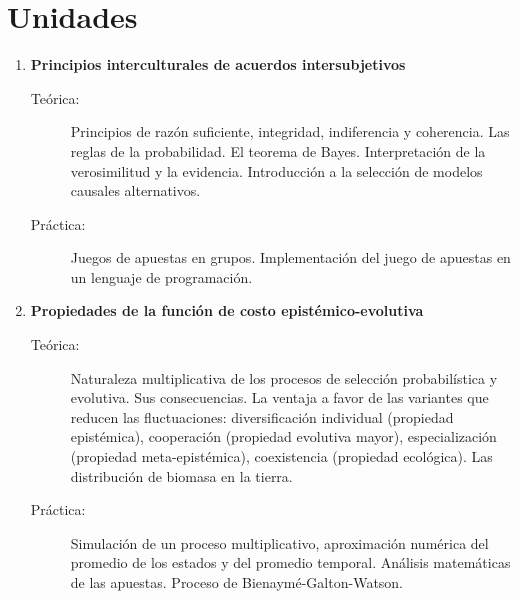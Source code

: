 \documentclass[10pt]{article}
\begin{document}
\section{Unidades}

\begin{enumerate}

\item \textbf{Principios interculturales de acuerdos intersubjetivos}
\vspace{-0.15cm}
\begin{description}
\item[Teórica:] Principios de razón suficiente, integridad, indiferencia y coherencia. Las reglas de la probabilidad. El teorema de Bayes. Interpretación de la verosimilitud y la evidencia. Introducción a la selección de modelos causales alternativos.
\item[Práctica:] Juegos de apuestas en grupos. Implementación del juego de apuestas en un lenguaje de programación.
\end{description}

\vspace{0.1cm}
\item \textbf{Propiedades de la función de costo epistémico-evolutiva}
\vspace{-0.15cm}
\begin{description}
\item[Teórica:] Naturaleza multiplicativa de los procesos de selección probabilística y evolutiva. Sus consecuencias. La ventaja a favor de las variantes que reducen las fluctuaciones: diversificación individual (propiedad epistémica), cooperación (propiedad evolutiva mayor), especialización (propiedad meta-epistémica), coexistencia (propiedad ecológica). Las distribución de biomasa en la tierra.
\item[Práctica:] Simulación de un proceso multiplicativo, aproximación numérica del promedio de los estados y del promedio temporal. Análisis matemáticas de las apuestas. Proceso de Bienaymé-Galton-Watson.
\end{description}



\end{enumerate}
\end{document}
